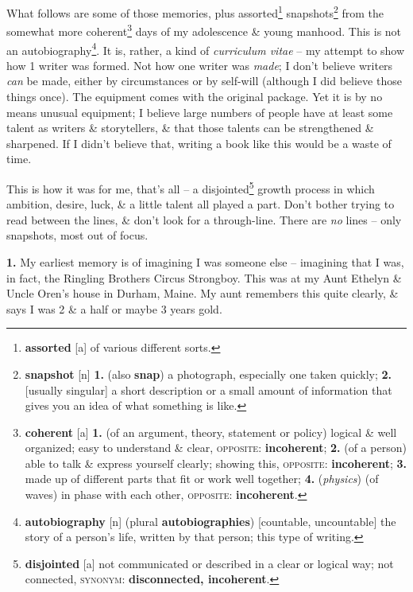 \documentclass[oneside]{book}
\numberwithin{equation}{section}
\begin{document}
What follows are some of those memories, plus assorted\footnote{\textbf{assorted} [a] of various different sorts.} snapshots\footnote{\textbf{snapshot} [n] \textbf{1.} (also \textbf{snap}) a photograph, especially one taken quickly; \textbf{2.} [usually singular] a short description or a small amount of information that gives you an idea of what something is like.} from the somewhat more coherent\footnote{\textbf{coherent} [a] \textbf{1.} (of an argument, theory, statement or policy) logical \& well organized; easy to understand \& clear, \textsc{opposite}: \textbf{incoherent}; \textbf{2.} (of a person) able to talk \& express yourself clearly; showing this, \textsc{opposite}: \textbf{incoherent}; \textbf{3.} made up of different parts that fit or work well together; \textbf{4.} (\textit{physics}) (of waves) in phase with each other, \textsc{opposite}: \textbf{incoherent}.} days of my adolescence \& young manhood. This is not an autobiography\footnote{\textbf{autobiography} [n] (plural \textbf{autobiographies}) [countable, uncountable] the story of a person's life, written by that person; this type of writing.}. It is, rather, a kind of \textit{curriculum vitae} -- my attempt to show how 1 writer was formed. Not how one writer was \textit{made}; I don't believe writers \textit{can} be made, either by circumstances or by self-will (although I did believe those things once). The equipment comes with the original package. Yet it is by no means unusual equipment; I believe large numbers of people have at least some talent as writers \& storytellers, \& that those talents can be strengthened \& sharpened. If I didn't believe that, writing a book like this would be a waste of time.

This is how it was for me, that's all -- a disjointed\footnote{\textbf{disjointed} [a] not communicated or described in a clear or logical way; not connected, \textsc{synonym}: \textbf{disconnected, incoherent}.} growth process in which ambition, desire, luck, \& a little talent all played a part. Don't bother trying to read between the lines, \& don't look for a through-line. There are \textit{no} lines -- only snapshots, most out of focus.

\textbf{1.} My earliest memory is of imagining I was someone else -- imagining that I was, in fact, the Ringling Brothers Circus Strongboy. This was at my Aunt Ethelyn \& Uncle Oren's house in Durham, Maine. My aunt remembers this quite clearly, \& says I was 2 \& a half or maybe 3 years gold.
\end{document}
